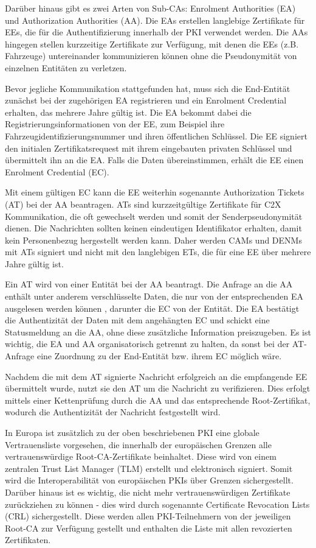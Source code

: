 Darüber hinaus gibt es zwei Arten von Sub-CAs: Enrolment Authorities (EA) und Authorization Authorities (AA). Die EAs erstellen langlebige Zertifikate für EEs, die für die Authentifizierung innerhalb der PKI verwendet werden. Die AAs hingegen stellen kurzzeitige Zertifikate zur Verfügung, mit denen die EEs (z.B. Fahrzeuge) untereinander kommunizieren können ohne die Pseudonymität von einzelnen Entitäten zu verletzen.

Bevor jegliche Kommunikation stattgefunden hat, muss sich die End-Entität zunächst bei der zugehörigen EA registrieren und ein Enrolment Credential erhalten, das mehrere Jahre gültig ist. Die EA bekommt dabei die Registrierungsinformationen von der EE, zum Beispiel ihre Fahrzeugidentifizierungsnummer und ihren öffentlichen Schlüssel. Die EE signiert den initialen Zertifikatsrequest mit ihrem eingebauten privaten Schlüssel und übermittelt ihn an die EA. Falls die Daten übereinstimmen, erhält die EE einen Enrolment Credential (EC).

Mit einem gültigen EC kann die EE weiterhin sogenannte Authorization Tickets (AT) bei der AA beantragen. ATs sind kurzzeitgültige Zertifikate für C2X Kommunikation, die oft gewechselt werden und somit der Senderpseudonymität dienen. Die Nachrichten sollten keinen eindeutigen Identifikator erhalten, damit kein Personenbezug hergestellt werden kann. Daher werden CAMs und DENMs mit ATs signiert und nicht mit den langlebigen ETs, die für eine EE über mehrere Jahre gültig ist. 

Ein AT wird von einer Entität bei der AA beantragt. Die Anfrage an die AA enthält unter anderem verschlüsselte Daten, die nur von der entsprechenden EA ausgelesen werden können \cite{ETSI2018}, darunter die EC von der Entität. Die EA bestätigt die Authentizität der Daten mit dem angehängten EC und schickt eine Statusmeldung an die AA, ohne diese zusätzliche Information preiszugeben. Es ist wichtig, die EA und AA organisatorisch getrennt zu halten, da sonst bei der AT-Anfrage eine Zuordnung zu der End-Entität bzw. ihrem EC möglich wäre.

Nachdem die mit dem AT signierte Nachricht erfolgreich an die empfangende EE übermittelt wurde, nutzt sie den AT um die Nachricht zu verifizieren. Dies erfolgt mittels einer Kettenprüfung durch die AA und das entsprechende Root-Zertifikat, wodurch die Authentizität der Nachricht festgestellt wird.

In Europa ist zusätzlich zu der oben beschriebenen PKI eine globale Vertrauensliste vorgesehen, die innerhalb der europäischen Grenzen alle vertrauenswürdige Root-CA-Zertifikate beinhaltet. Diese wird von einem zentralen Trust List Manager (TLM) erstellt und elektronisch signiert. Somit wird die Interoperabilität von europäischen PKIs über Grenzen sichergestellt. Darüber hinaus ist es wichtig, die nicht mehr vertrauenswürdigen Zertifikate zurückziehen zu können - dies wird durch sogenannte Certificate Revocation Lists (CRL) sichergestellt. Diese werden allen PKI-Teilnehmern von der jeweiligen Root-CA zur Verfügung gestellt und enthalten die Liste mit allen revozierten Zertifikaten.  

